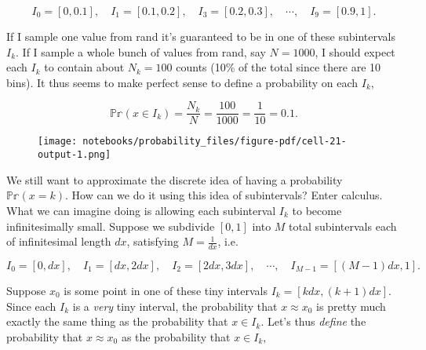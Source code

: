 \documentclass[
  letterpaper,
  DIV=11,
  numbers=noendperiod]{scrreprt}
\newenvironment{Shaded}{\begin{snugshade}}{\end{snugshade}}
\newcommand{\DecValTok}[1]{\textcolor[rgb]{0.68,0.00,0.00}{#1}}
\newcommand{\NormalTok}[1]{\textcolor[rgb]{0.00,0.23,0.31}{#1}}
\newcommand{\OperatorTok}[1]{\textcolor[rgb]{0.37,0.37,0.37}{#1}}
\newcommand{\SpecialCharTok}[1]{\textcolor[rgb]{0.37,0.37,0.37}{#1}}
\newcommand{\SpecialStringTok}[1]{\textcolor[rgb]{0.13,0.47,0.30}{#1}}
\begin{document}
\[I_0=[0,0.1], \quad I_1=[0.1,0.2], \quad I_3=[0.2,0.3], \quad \cdots, \quad I_9=[0.9,1].\]

If I sample one value from rand it's guaranteed to be in one of these
subintervals \(I_k\). If I sample a whole bunch of values from rand, say
\(N=1000\), I should expect each \(I_k\) to contain about \(N_k=100\)
counts (10\% of the total since there are 10 bins). It thus seems to
make perfect sense to define a probability on each \(I_k\),

\[\mathbb{Pr}(x \in I_k) = \frac{N_k}{N} = \frac{100}{1000} = \frac{1}{10} = 0.1.\]

\begin{Shaded}
\end{Shaded}

\begin{figure}[H]

{\centering \texttt{[image: notebooks/probability\_files/figure-pdf/cell-21-output-1.png]}

}

\end{figure}

We still want to approximate the discrete idea of having a probability
\(\mathbb{Pr}(x=k)\). How can we do it using this idea of subintervals?
Enter calculus. What we can imagine doing is allowing each subinterval
\(I_k\) to become infinitesimally small. Suppose we subdivide \([0,1]\)
into \(M\) total subintervals each of infinitesimal length \(dx\),
satisfying \(M=\frac{1}{dx}\), i.e.

\[I_0=[0,dx], \quad I_1=[dx, 2dx], \quad I_2=[2dx, 3dx], \quad \cdots, \quad I_{M-1}=[(M-1)dx, 1].\]

Suppose \(x_0\) is some point in one of these tiny intervals
\(I_k=[kdx, (k+1)dx]\). Since each \(I_k\) is a \emph{very} tiny
interval, the probability that \(x \approx x_0\) is pretty much exactly
the same thing as the probability that \(x \in I_k\). Let's thus
\emph{define} the probability that \(x \approx x_0\) as the probability
that \(x \in I_k\),
\end{document}
